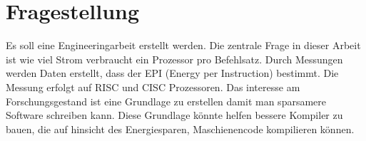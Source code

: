 \chapter{Fragestellung}

Es soll eine Engineeringarbeit erstellt werden. Die zentrale Frage in dieser Arbeit ist wie viel Strom
verbraucht ein Prozessor pro Befehlsatz. Durch Messungen werden Daten erstellt, dass der EPI (Energy per Instruction)
bestimmt. Die Messung erfolgt auf RISC und CISC Prozessoren. Das interesse am Forschungsgestand ist eine Grundlage
zu erstellen damit man sparsamere Software schreiben kann. Diese Grundlage könnte helfen bessere Kompiler zu bauen,
die auf hinsicht des Energiesparen, Maschienencode kompilieren können. 

